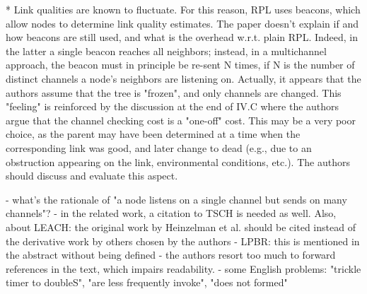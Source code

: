 * Link qualities are known to fluctuate. For this reason, RPL uses beacons,
  which allow nodes to determine link quality estimates. The paper doesn't
  explain if and how beacons are still used, and what is the overhead
  w.r.t. plain RPL. Indeed, in the latter a single beacon reaches all
  neighbors; instead, in a multichannel approach, the beacon must in principle
  be re-sent N times, if N is the number of distinct channels a node's
  neighbors are listening on.
  Actually, it appears that the authors assume that the tree is "frozen", and
  only channels are changed. This "feeling" is reinforced by the discussion
  at the end of IV.C where the authors argue that the channel checking cost is
  a "one-off" cost. This may be a very poor choice, as the parent may
  have been determined at a time when the corresponding link was good, and
  later change to dead (e.g., due to an obstruction appearing on the link,
  environmental conditions, etc.). The authors should discuss and evaluate
  this aspect. 
  
- what's the rationale of "a node listens on a single channel but sends on
many channels"?
- in the related work, a citation to TSCH is needed as well. Also, about
LEACH: the original work by Heinzelman et al. should be cited instead of the
derivative work by others chosen by the authors
- LPBR: this is mentioned in the abstract without being defined
- the authors resort too much to forward references in the text, which impairs
readability. 
- some English problems: "trickle timer to doubleS", "are less frequently
invoke", "does not formed"
